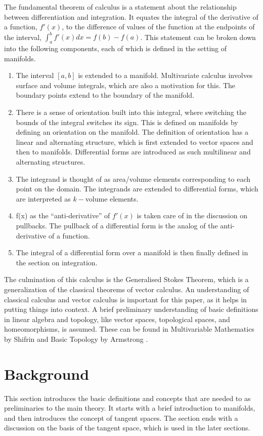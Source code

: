 \documentclass{article}
\newcounter{definition}[section]
\begin{document}
The fundamental theorem of calculus is a statement about the relationship between differentiation and integration. It equates the integral of the derivative of a function, $f'(x)$, to the difference of values of the function at the endpoints of the interval, $\int_a^bf'(x)dx = f(b) - f(a)$. This statement can be broken down into the following components, each of which is defined in the setting of manifolds.
\begin{enumerate}
    \item The interval $[a, b]$ is extended to a manifold. Multivariate calculus involves surface and volume integrals, which are also a motivation for this. The boundary points extend to the boundary of the manifold.
    \item There is a sense of orientation built into this integral, where switching the bounds of the integral switches its sign. This is defined on manifolds by defining an orientation on the manifold. The definition of orientation has a linear and alternating structure, which is first extended to vector spaces and then to manifolds. Differential forms are introduced as such multilinear and alternating structures.
    \item The integrand is thought of as area/volume elements corresponding to each point on the domain. The integrands are extended to differential forms, which are interpreted as $k-$volume elements.
    \item f(x) as the “anti-derivative” of $f'(x)$ is taken care of in the discussion on pullbacks. The pullback of a differential form is the analog of the anti-derivative of a function.
    \item The integral of a differential form over a manifold is then finally defined in the section on integration.
\end{enumerate}


The culmination of this calculus is the Generalised Stokes Theorem, which is a generalization of the classical theorems of vector calculus. An understanding of classical calculus and vector calculus is important for this paper, as it helps in putting things into context. A brief preliminary understanding of basic definitions in linear algebra and topology, like vector spaces, topological spaces, and homeomorphisms, is assumed. These can be found in Multivariable Mathematics by Shifrin \cite{shifrin2004multivariable} and Basic Topology by Armstrong \cite{armstrong2013basic}. 

 
\section{Background}
This section introduces the basic definitions and concepts that are needed to as preliminaries to the main theory. It starts with a brief introduction to manifolds, and then introduces the concept of tangent spaces. The section ends with a discussion on the basis of the tangent space, which is used in the later sections.
\end{document}
